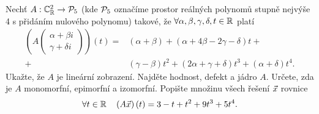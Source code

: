 \documentclass{article}
\newcommand{\mathfield}{\ensuremath{\mathbb}}
\newcommand{\mathspace}{\ensuremath{\mathcal}}
\newcommand{\mathvec}{\ensuremath{\vec}}
\begin{document}
\newpage

\begin{Exercise}[name=Úkol]
	Nechť \( A : \mathfield{C}^2_\mathfield{R} \to \mathspace{P}_5 \) (kde \( \mathspace{P}_5 \) označíme prostor reálných polynomů stupně nejvýše 4 s přidáním nulového polynomu) takové, že \( \forall \alpha, \beta, \gamma, \delta, t \in \mathfield{R} \) platí
	\[
		\begin{aligned}
			 \left( A \begin{pmatrix} \alpha + \beta i \\ \gamma + \delta i \end{pmatrix} \right) \left( t \right) = &\left( \alpha + \beta \right) + \left( \alpha + 4\beta - 2\gamma - \delta \right) t + \\
			+ &\left( \gamma - \beta \right) t^2 + \left( 2\alpha + \gamma + \delta \right) t^3 + \left( \alpha + \delta \right) t^4 \text{.}
		\end{aligned}
	\]
	\Question Ukažte, že \( A \) je lineární zobrazení.
	\Question Najděte hodnost, defekt a jádro \( A \).
	\Question Určete, zda je \( A \) monomorfní, epimorfní a izomorfní.
	\Question Popište množinu všech řešení \( \mathvec{x} \) rovnice
	\[
		\forall t \in \mathfield{R} \quad \left( A \mathvec{x} \right) \left( t \right) = 3 - t + t^2 + 9t^3 + 5t^4 \text{.}
	\]
\end{Exercise}
\end{document}
